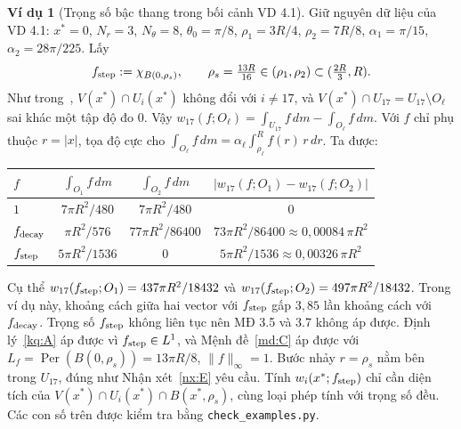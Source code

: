 \documentclass[12pt,a4paper]{article}
\theoremstyle{plain}
\theoremstyle{definition}
\newtheorem{vd}{Ví dụ}
\newcommand{\Per}{\operatorname{Per}}
\newcommand{\dm}{\,dm}
\begin{document}
\begin{vd}[Trọng số bậc thang trong bối cảnh VD 4.1]\label{vd:step}
Giữ nguyên dữ liệu của VD 4.1: $x^*=0$, $N_r=3$, $N_\theta=8$, $\theta_0=\pi/8$, $\rho_1=3R/4$, $\rho_2=7R/8$, $\alpha_1=\pi/15$, $\alpha_2=28\pi/225$. Lấy
\[
f_{\rm step}:=\chi_{B(0,\rho_s)},\qquad \rho_s=\tfrac{13R}{16}\in(\rho_1,\rho_2)\subset(\tfrac{2R}{3},R).
\]
Như trong~\cite{huu2026}, $V(x^*)\cap U_i(x^*)$ không đổi với $i\ne17$, và $V(x^*)\cap U_{17}=U_{17}\setminus O_\ell$ sai khác một tập độ đo $0$. Vậy $w_{17}(f;O_\ell)=\int_{U_{17}}f\dm-\int_{O_\ell}f\dm$. Với $f$ chỉ phụ thuộc $r=|x|$, tọa độ cực cho $\int_{O_\ell}f\dm=\alpha_\ell\int_{\rho_\ell}^Rf(r)\,r\,dr$. Ta được:

\begin{center}
\begin{tabular}{@{}lccc@{}}
\toprule
$f$ & $\int_{O_1}f\dm$ & $\int_{O_2}f\dm$ & $|w_{17}(f;O_1)-w_{17}(f;O_2)|$ \\
\midrule
$1$ & $7\pi R^2/480$ & $7\pi R^2/480$ & $0$ \\
$f_{\rm decay}$ & $\pi R^2/576$ & $77\pi R^2/86400$ & $73\pi R^2/86400\approx0{,}00084\,\pi R^2$ \\
$f_{\rm step}$ & $5\pi R^2/1536$ & $0$ & $5\pi R^2/1536\approx0{,}00326\,\pi R^2$ \\
\bottomrule
\end{tabular}
\end{center}

Cụ thể $w_{17}(f_{\rm step};O_1)=437\pi R^2/18432$ và $w_{17}(f_{\rm step};O_2)=497\pi R^2/18432$. Trong ví dụ này, khoảng cách giữa hai vector với $f_{\rm step}$ gấp $3{,}85$ lần khoảng cách với $f_{\rm decay}$. Trọng số $f_{\rm step}$ không liên tục nên MĐ 3.5 và 3.7 không áp được. Định lý~\ref{kq:A} áp được vì $f_{\rm step}\in L^1$, và Mệnh đề~\ref{md:C} áp được với $L_f=\Per(B(0,\rho_s))=13\pi R/8$, $\|f\|_\infty=1$. Bước nhảy $r=\rho_s$ nằm bên trong $U_{17}$, đúng như Nhận xét~\ref{nx:E} yêu cầu. Tính $w_i(x^*;f_{\rm step})$ chỉ cần diện tích của $V(x^*)\cap U_i(x^*)\cap B(x^*,\rho_s)$, cùng loại phép tính với trọng số đều. Các con số trên được kiểm tra bằng \texttt{check\_examples.py}.
\end{vd}
\end{document}
